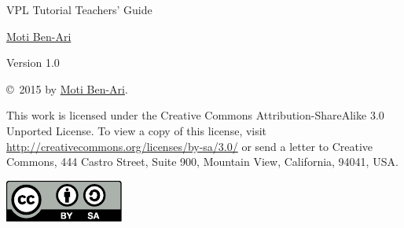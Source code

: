 \documentclass[11pt,a4paper,english]{article}
\begin{document}
\thispagestyle{empty}

\begin{center}
\begin{Huge}
\begin{bfseries}
VPL Tutorial Teachers' Guide
\end{bfseries}
\end{Huge}

\vskip 2cm

\begin{LARGE}
\href{http://www.weizmann.ac.il/sci-tea/benari/}{Moti Ben-Ari}\\%
\end{LARGE}

\vskip 1cm

\begin{Large}
Version 1.0
\end{Large}

\end{center}

\vfill

\begin{center}
\copyright{}\  2015 by \href{http://www.weizmann.ac.il/sci-tea/benari/}{Moti Ben-Ari}. %
\end{center}

This work is licensed under the Creative Commons
Attribution-ShareAlike 3.0 Unported License. To view a copy
of this license, visit
\href{http://creativecommons.org/licenses/by-sa/3.0/}{http://creativecommons.org/licenses/by-sa/3.0/}
or send a letter to Creative Commons, 444 Castro Street, Suite 900,
Mountain View, California, 94041, USA.

\begin{center}
\includegraphics[width=.2\textwidth]{by-sa}
\end{center}


\newpage

\end{document}
